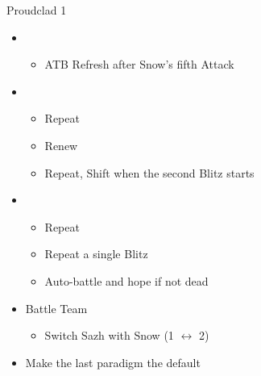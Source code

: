 \documentclass{report}
\begin{document}
\begin{battle}{Proudclad 1}
\begin{itemize}
\begin{itemize}
    \end{itemize}
    \item \first
    \begin{itemize}
        \item ATB Refresh after Snow's fifth Attack
    \end{itemize}
    \item \second
    \begin{itemize}
        \item Repeat
        \item Renew
        \item Repeat, Shift when the second Blitz starts
    \end{itemize}
    \item \first
    \begin{itemize}
        \item Repeat
        \item Repeat a single Blitz
        \item Auto-battle and hope if not dead
    \end{itemize}
\end{itemize}
\end{battle}
\begin{menu}
\begin{itemize}
    \paradigm
    \begin{itemize}
        \item Battle Team
        \begin{itemize}
            \item Switch Sazh with Snow (1 $\leftrightarrow$ 2)
        \end{itemize}
        \item Make the last paradigm the default
    \end{itemize}
\end{itemize}
\end{menu}
\end{document}
